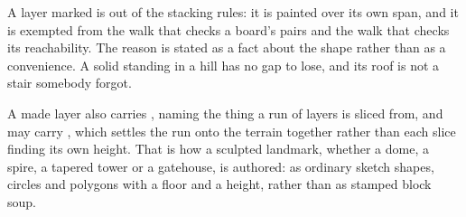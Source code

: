 A layer marked  is out of the stacking rules: it is painted over
its own span, and it is exempted from the walk that checks a board's pairs and the
walk that checks its reachability. The reason is stated as a fact about the shape
rather than as a convenience. A solid standing in a hill has no gap to lose, and
its roof is not a stair somebody forgot.

A made layer also carries , naming the thing a run of layers is sliced
from, and may carry , which settles the run onto the terrain
together rather than each slice finding its own height. That is how a sculpted
landmark, whether a dome, a spire, a tapered tower or a gatehouse, is authored: as
ordinary sketch shapes, circles and polygons with a floor and a height, rather than
as stamped block soup.
